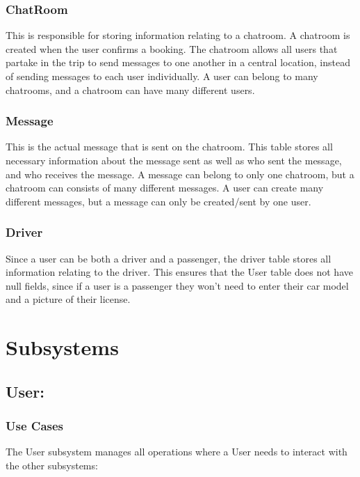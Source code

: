 \documentclass[hidelinks, 12pt, a4paper]{article}
\begin{document}
\subsubsection{ChatRoom}
This is responsible for storing information relating to a chatroom. A chatroom is created when the user confirms a booking. The chatroom allows all users that partake in the trip to send messages to one another in a central location, instead of sending messages to each user individually. A user can belong to many chatrooms, and a chatroom can have many different users.


\subsubsection{Message}
This is the actual message that is sent on the chatroom. This table stores all necessary information about the message sent as well as who sent the message, and who receives the message. A message can belong to only one chatroom, but a chatroom can consists of many different messages. A user can create many different messages, but a message can only be created/sent by one user.

\subsubsection{Driver}
Since a user can be both a driver and a passenger, the driver table stores all information relating to the driver. This ensures that the User table does not have null fields, since if a user is a passenger they won’t need to enter their car model and a picture of their license.

\newpage
\section{Subsystems}

\subsection{User:}
\subsubsection{Use Cases}
The User subsystem manages all operations where a User needs to interact with the other subsystems:
\end{document}
